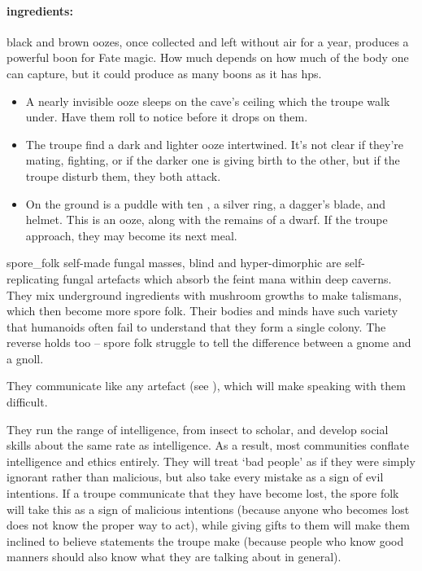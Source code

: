 \begin{multicols}{2}
\jelly

\paragraph{\Glspl{ingredient}:}
black and brown oozes, once collected and left without air for a year, produces a powerful \gls{boon} for Fate magic.
How much depends on how much of the body one can capture, but it could produce as many \glspl{boon} as it has \glspl{hp}.

\showEnc

\begin{itemize}
  \item
  A nearly invisible ooze sleeps on the cave's ceiling which the troupe walk under.
  Have them roll  to notice before it drops on them.
  \item
  The troupe find a dark and lighter ooze intertwined.
  It's not clear if they're mating, fighting, or if the darker one is giving birth to the other, but if the troupe disturb them, they both attack.
  \item
  On the ground is a puddle with ten , a silver ring, a dagger's blade, and helmet.
  This is an ooze, along with the remains of a dwarf.
  If the troupe approach, they may become its next meal.
\end{itemize}

\jelly

  {spore_folk}%
  {self-made fungal masses, blind and hyper-dimorphic}%
are self-replicating fungal \glspl{artefact} which absorb the feint mana within deep caverns.
They mix underground \glspl{ingredient} with mushroom growths to make \glspl{talisman}, which then become more spore folk.
Their bodies and minds have such variety that humanoids often fail to understand that they form a single colony.
The reverse holds too -- spore folk struggle to tell the difference between a gnome and a gnoll.

They communicate like any \gls{artefact} (see ), which will make speaking with them difficult.

They run the range of intelligence, from insect to scholar, and develop social skills about the same rate as intelligence.
As a result, most communities conflate intelligence and ethics entirely.
They will treat `bad people' as if they were simply ignorant rather than malicious, but also take every mistake as a sign of evil intentions.
If a troupe communicate that they have become lost, the spore folk will take this as a sign of malicious intentions (because anyone who becomes lost does not know the proper way to act), while giving gifts to them will make them inclined to believe statements the troupe make (because people who know good manners should also know what they are talking about in general).


\end{multicols}
